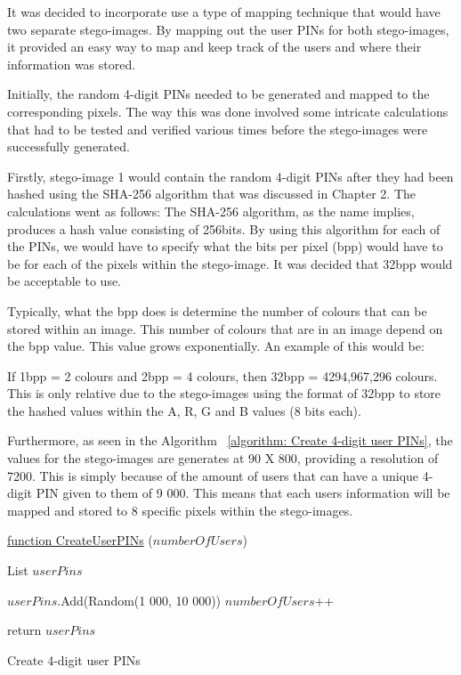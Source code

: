 It was decided to incorporate use a type of mapping technique that would have two separate stego-images. By mapping out the user PINs for both stego-images, it provided an easy way to map and keep track of the users and where their information was stored. 

Initially, the random 4-digit PINs needed to be generated and mapped to the corresponding pixels. The way this was done involved some intricate calculations that had to be tested and verified various times before the stego-images were successfully generated. 

Firstly, stego-image 1 would contain the random 4-digit PINs after they had been hashed using the SHA-256 algorithm that was discussed in Chapter 2. The calculations went as follows:
The SHA-256 algorithm, as the name implies, produces a hash value consisting of 256bits. 
By using this algorithm for each of the PINs, we would have to specify what the bits per pixel (bpp) would have to be for each of the pixels within the stego-image. It was decided that 32bpp would be acceptable to use. 

Typically, what the bpp does is determine the number of colours that can be stored within an image. This number of colours that are in an image depend on the bpp value. This value grows exponentially. An example of this would be: 

If 1bpp = 2 colours and 2bpp = 4 colours, then 32bpp = 4294,967,296 colours. This is only relative due to the stego-images using the format of 32bpp to store the hashed values within the A, R, G and B values (8 bits each).

Furthermore, as seen in the Algorithm ~\ref{algorithm: Create 4-digit user PINs}, the values for the stego-images are generates at 90 X 800, providing a resolution of 7200. This is simply because of the amount of users that can have a unique 4-digit PIN given to them of 9 000. This means that each users information will be mapped and stored to 8 specific pixels within the stego-images. 



\begin{algorithm}
     
     \underline{function CreateUserPINs} ($numberOfUsers$)\;
     
     List $userPins$ \;
     
     {
        $userPins$.Add(Random(1 000, 10 000))\;
        $numberOfUsers$++\;
     }
     
     return $userPins$\;
     
     \label{algorithm: Create 4-digit user PINs}
     \caption{Create 4-digit user PINs}
\end{algorithm}

